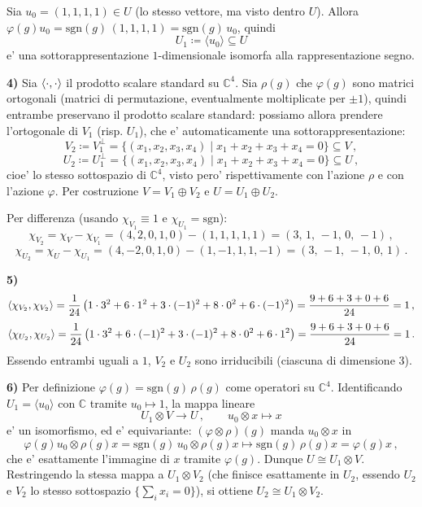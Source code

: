 \documentclass{report}
\begin{document}
{  Sia $ u_0 = (1,1,1,1) \in U $ (lo stesso vettore, ma visto dentro $ U $). Allora $ \varphi(g) u_0 = \mathrm{sgn}(g)\, (1,1,1,1) = \mathrm{sgn}(g)\, u_0 $, quindi
  \[
    U_1 \coloneq \langle u_0 \rangle \subseteq U
  \]
  e' una sottorappresentazione $ 1 $-dimensionale isomorfa alla rappresentazione segno.

  \textbf{4)} Sia $ \langle \cdot, \cdot \rangle $ il prodotto scalare standard su $ \mathbb{C}^4 $. Sia $ \rho(g) $ che $ \varphi(g) $ sono matrici ortogonali (matrici di permutazione, eventualmente moltiplicate per $ \pm 1 $), quindi entrambe preservano il prodotto scalare standard: possiamo allora prendere l'ortogonale di $ V_1 $ (risp. $ U_1 $), che e' automaticamente una sottorappresentazione:
  \[
    V_2 \coloneq V_1^{\perp} = \{ (x_1,x_2,x_3,x_4) \mid x_1+x_2+x_3+x_4 = 0 \} \subseteq V\,,
  \]
  \[
    U_2 \coloneq U_1^{\perp} = \{ (x_1,x_2,x_3,x_4) \mid x_1+x_2+x_3+x_4 = 0 \} \subseteq U\,,
  \]
  cioe' lo stesso sottospazio di $ \mathbb{C}^4 $, visto pero' rispettivamente con l'azione $ \rho $ e con l'azione $ \varphi $. Per costruzione $ V = V_1 \oplus V_2 $ e $ U = U_1 \oplus U_2 $.

  Per differenza (usando $ \chi_{V_1} \equiv 1 $ e $ \chi_{U_1} = \mathrm{sgn} $):
  \[
    \chi_{V_2} = \chi_V - \chi_{V_1} = (4,2,0,1,0) - (1,1,1,1,1) = (3,\, 1,\, -1,\, 0,\, -1)\,,
  \]
  \[
    \chi_{U_2} = \chi_U - \chi_{U_1} = (4,-2,0,1,0) - (1,-1,1,1,-1) = (3,\, -1,\, -1,\, 0,\, 1)\,.
  \]

  \textbf{5)}
  \[
    \langle \chi_{V_2}, \chi_{V_2} \rangle = \frac{1}{24}\left(1 \cdot 3^2 + 6 \cdot 1^2 + 3 \cdot (-1)^2 + 8 \cdot 0^2 + 6 \cdot (-1)^2\right) = \frac{9+6+3+0+6}{24} = 1\,,
  \]
  \[
    \langle \chi_{U_2}, \chi_{U_2} \rangle = \frac{1}{24}\left(1 \cdot 3^2 + 6 \cdot (-1)^2 + 3 \cdot (-1)^2 + 8 \cdot 0^2 + 6 \cdot 1^2\right) = \frac{9+6+3+0+6}{24} = 1\,.
  \]
  Essendo entrambi uguali a $ 1 $, $ V_2 $ e $ U_2 $ sono irriducibili (ciascuna di dimensione $ 3 $).

  \textbf{6)} Per definizione $ \varphi(g) = \mathrm{sgn}(g)\, \rho(g) $ come operatori su $ \mathbb{C}^4 $. Identificando $ U_1 = \langle u_0 \rangle $ con $ \mathbb{C} $ tramite $ u_0 \mapsto 1 $, la mappa lineare
  \[
    U_1 \otimes V \longrightarrow U\,, \qquad u_0 \otimes x \longmapsto x
  \]
  e' un isomorfismo, ed e' equivariante: $ (\varphi \otimes \rho)(g) $ manda $ u_0 \otimes x $ in
  \[
    \varphi(g) u_0 \otimes \rho(g) x = \mathrm{sgn}(g)\, u_0 \otimes \rho(g) x \longmapsto \mathrm{sgn}(g)\, \rho(g) x = \varphi(g) x\,,
  \]
  che e' esattamente l'immagine di $ x $ tramite $ \varphi(g) $. Dunque $ U \cong U_1 \otimes V $. Restringendo la stessa mappa a $ U_1 \otimes V_2 $ (che finisce esattamente in $ U_2 $, essendo $ U_2 $ e $ V_2 $ lo stesso sottospazio $ \{ \sum_i x_i = 0 \} $), si ottiene $ U_2 \cong U_1 \otimes V_2 $.

}
\end{document}
